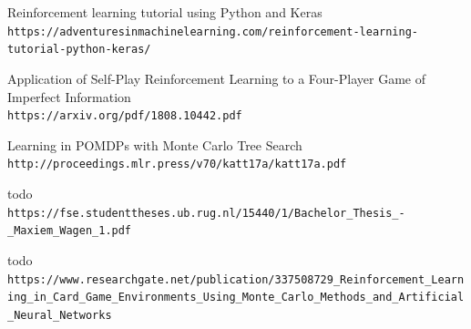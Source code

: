 \documentclass[11pt]{article}
\begin{document}
\begin{thebibliography}{9}
Reinforcement learning tutorial using Python and Keras 
\\\texttt{https://adventuresinmachinelearning.com/reinforcement-learning-tutorial-python-keras/}

Application of Self-Play Reinforcement Learning to a Four-Player Game of Imperfect Information
\\\texttt{https://arxiv.org/pdf/1808.10442.pdf}

Learning in POMDPs with Monte Carlo Tree Search
\\\texttt{http://proceedings.mlr.press/v70/katt17a/katt17a.pdf}

todo
\\\texttt{https://fse.studenttheses.ub.rug.nl/15440/1/Bachelor_Thesis_-_Maxiem_Wagen_1.pdf}

todo
\\\texttt{https://www.researchgate.net/publication/337508729_Reinforcement_Learning_in_Card_Game_Environments_Using_Monte_Carlo_Methods_and_Artificial_Neural_Networks}
\end{thebibliography}
\end{document}

